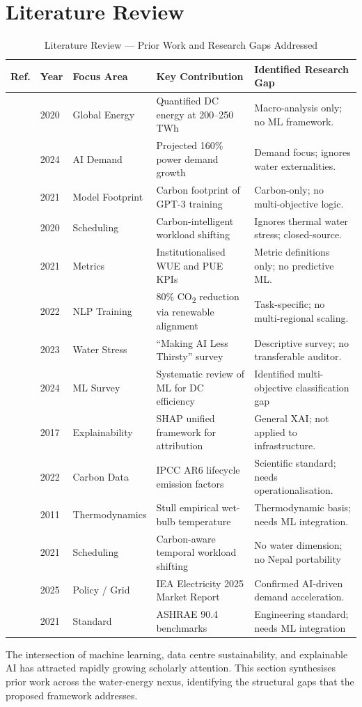 \documentclass[conference]{IEEEtran}
\begin{document}
\section{Literature Review}
\begin{table}[t!]
\caption{Literature Review — Prior Work and Research Gaps Addressed}
\begin{center}
\begin{tabularx}{\textwidth}{|l|l|l|X|X|}
\hline
\textbf{Ref.} & \textbf{Year} & \textbf{Focus Area} & \textbf{Key Contribution} & \textbf{Identified Research Gap} \\ \hline
[1] & 2020 & Global Energy & Quantified DC energy at 200–250 TWh & Macro-analysis only; no ML framework. \\ \hline
[2] & 2024 & AI Demand & Projected 160\% power demand growth & Demand focus; ignores water externalities. \\ \hline
[3] & 2021 & Model Footprint & Carbon footprint of GPT-3 training & Carbon-only; no multi-objective logic. \\ \hline
[4] & 2020 & Scheduling & Carbon-intelligent workload shifting & Ignores thermal water stress; closed-source. \\ \hline
[5] & 2021 & Metrics & Institutionalised WUE and PUE KPIs & Metric definitions only; no predictive ML. \\ \hline
[6] & 2022 & NLP Training & 80\% CO\textsubscript{2} reduction via renewable alignment & Task-specific; no multi-regional scaling. \\ \hline
[7] & 2023 & Water Stress & ``Making AI Less Thirsty'' survey & Descriptive survey; no transferable auditor. \\ \hline
[8] & 2024 & ML Survey & Systematic review of ML for DC efficiency & Identified multi-objective classification gap \\ \hline
[9] & 2017 & Explainability & SHAP unified framework for attribution & General XAI; not applied to infrastructure. \\ \hline
[10] & 2022 & Carbon Data & IPCC AR6 lifecycle emission factors & Scientific standard; needs operationalisation. \\ \hline
[11] & 2011 & Thermodynamics & Stull empirical wet-bulb temperature & Thermodynamic basis; needs ML integration. \\ \hline
[12] & 2021 & Scheduling & Carbon-aware temporal workload shifting & No water dimension; no Nepal portability \\ \hline
[13] & 2025 & Policy / Grid & IEA Electricity 2025 Market Report & Confirmed AI-driven demand acceleration. \\ \hline
[14] & 2021 & Standard & ASHRAE 90.4 benchmarks & Engineering standard; needs ML integration \\ \hline
\end{tabularx}
\end{center}
\end{table}
The intersection of machine learning, data centre sustainability, and explainable AI has attracted rapidly growing scholarly attention. This section synthesises prior work across the water-energy nexus, identifying the structural gaps that the proposed framework addresses.
\end{document}
